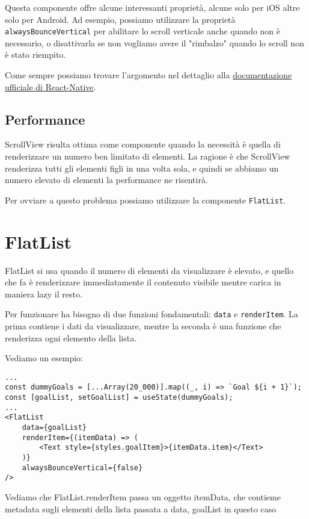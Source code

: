 \documentclass[12pt]{article}
\begin{document}
Questa componente offre alcune interessanti proprietà, alcune solo per iOS altre 
solo per Android. Ad esempio, possiamo utilizzare la proprietà \texttt{alwaysBounceVertical}
per abilitare lo scroll verticale anche quando non è necessario, o disattivarla se non
vogliamo avere il "rimbalzo" quando lo scroll non è stato riempito.

Come sempre possiamo trovare l'argomento nel dettaglio alla
\href{https://reactnative.dev/docs/scrollview#alwaysbouncevertical}{documentazione ufficiale di React-Native}.

\subsection{Performance}
ScrollView risulta ottima come componente quando la necessità
è quella di renderizzare un numero ben limitato di elementi.
La ragione è che ScrollView renderizza tutti gli elementi figli
in una volta sola, e quindi se abbiamo un numero elevato di elementi
la performance ne risentirà.

Per ovviare a questo problema possiamo utilizzare la componente \texttt{FlatList}.

\section{FlatList}
FlatList si usa quando il numero di elementi da visualizzare è elevato, 
e quello che fa è renderizzare immediatamente il contenuto visibile mentre carica in maniera lazy
il resto. 

Per funzionare ha bisogno di due funzioni fondamentali: \texttt{data} e \texttt{renderItem}.
La prima contiene i dati da visualizzare, mentre la seconda è una funzione che renderizza
ogni elemento della lista.

Vediamo un esempio: 
\begin{verbatim}
...
const dummyGoals = [...Array(20_000)].map((_, i) => `Goal ${i + 1}`);
const [goalList, setGoalList] = useState(dummyGoals);
...
<FlatList
    data={goalList}
    renderItem={(itemData) => (
        <Text style={styles.goalItem}>{itemData.item}</Text>
    )}
    alwaysBounceVertical={false}
/>
\end{verbatim}
Vediamo che FlatList.renderItem passa un oggetto itemData, che contieme metadata
sugli elementi della lista passata a data, goalList in questo caso
\end{document}
